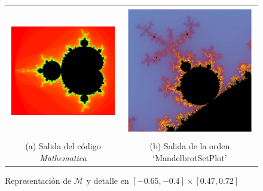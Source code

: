 \begin{figure}[ht]
  \centering
  \begin{tabular}{cc}
    \includegraphics[scale=0.54]{./img/C3/Mandelbrot-Mathematica.png} &   \includegraphics[scale=0.46]{./img/C3/MandelbrotSetPlot.png} \\
  (a) Salida del código \textit{Mathematica}  & (b) Salida de la orden `MandelbrotSetPlot' \\[6pt]
  \end{tabular}
  \caption{Representación de $\mathcal{M}$ y detalle en $[-0.65, -0.4]\times[0.47, 0.72]$}
  \label{fig:Mandelbrot-explicado}
\end{figure}

